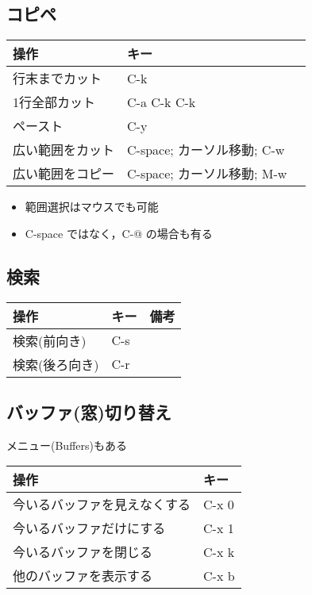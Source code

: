 \documentclass[landscape,7pt,dvipdfmx]{article}
\begin{document}
\begin{multicols*}{3}
{\subsection{コピペ}
\begin{tabular}{|l|l|l|}\hline
操作 & キー \\\hline
行末までカット & C-k \\
1行全部カット & C-a C-k C-k \\
ペースト & C-y \\
広い範囲をカット & C-space; カーソル移動; C-w  \\
広い範囲をコピー & C-space; カーソル移動; M-w \\\hline
\end{tabular}

\begin{itemize}
\item 範囲選択はマウスでも可能
\item C-space ではなく，C-@ の場合も有る
\end{itemize}



\subsection{検索}
\begin{tabular}{|l|l|l|}\hline
操作 & キー & 備考 \\\hline
検索(前向き) & C-s & \\
検索(後ろ向き) & C-r & \\\hline
\end{tabular}

\subsection{バッファ(窓)切り替え}
メニュー(Buffers)もある

\begin{tabular}{|l|l|}\hline
操作 & キー \\\hline
今いるバッファを見えなくする & C-x 0 \\
今いるバッファだけにする & C-x 1 \\
今いるバッファを閉じる & C-x k \\
他のバッファを表示する & C-x b \\\hline
\end{tabular}
}


\end{multicols*}
\end{document}
